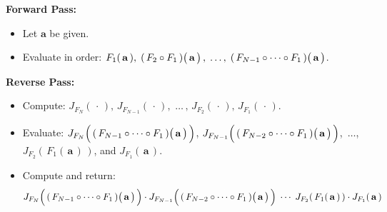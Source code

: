 \vskip 0.5cm
\noindent
\textbf{Forward Pass:}
\begin{itemize}
\item
	Let \;$\mathbf{a}$\; be given.
\item
	Evaluate in order: \;
	$F_{1}(\,\mathbf{a}\,),\;
	(\,F_{2}\circ F_{1}\,)\!\left(\,\overset{{\color{white}.}}{\mathbf{a}}\,\right),\;
	\ldots,\;
	(\,F_{N-1}\circ \cdots \circ F_{1}\,)\!\left(\,\overset{{\color{white}.}}{\mathbf{a}}\,\right)
	$.
\end{itemize}
\vskip 0.3cm
\noindent
\textbf{Reverse Pass:}
\begin{itemize}
\item
	Compute:\;
	$J_{F_{N}}\!\left(\,\cdot\,\right),\,
	J_{F_{N-1}}\!\left(\,\cdot\,\right),\,
	\,\ldots\,,\,
	J_{F_{2}}\!\left(\,\cdot\,\right),\,
	J_{F_{1}}\!\left(\,\cdot\,\right)$.
\item
	Evaluate:\;
	$J_{F_{N}}\!\left(\,
		\overset{{\color{white}.}}{(\,F_{N-1}\circ \cdots \circ F_{1}\,)
		\!\left(\,\overset{{\color{white}.}}{\mathbf{a}}\,\right)}
		\,\right)$,
	$J_{F_{N-1}}\!\left(\,
		\overset{{\color{white}.}}{(\,F_{N-2}\circ \cdots \circ F_{1}\,)
		\!\left(\,\overset{{\color{white}.}}{\mathbf{a}}\,\right)}
		\,\right)$,
	\,$\ldots$\;,
	$J_{F_{2}}\!\left(\,F_{1}(\,\mathbf{a}\,)\,\right)$,
	and
	$J_{F_{1}}\!\left(\,\mathbf{a}\,\right)$.
\item
	Compute and return:
	\begin{equation*}
	J_{F_{N}}\!\left(\,
		\overset{{\color{white}.}}{(\,F_{N-1}\circ \cdots \circ F_{1}\,)
		\!\left(\,\overset{{\color{white}.}}{\mathbf{a}}\,\right)}
		\,\right)
	\cdot
	J_{F_{N-1}}\!\left(\,
		\overset{{\color{white}.}}{(\,F_{N-2}\circ \cdots \circ F_{1}\,)
		\!\left(\,\overset{{\color{white}.}}{\mathbf{a}}\,\right)}
		\,\right)
	\;
	\cdots
	\;
	J_{F_{2}}\!\left(\,F_{1}(\,\mathbf{a}\,)\,\right)
	\cdot
	J_{F_{1}}\!\left(\,\mathbf{a}\,\right)
	\end{equation*}
\end{itemize}



\renewcommand{\theenumi}{\roman{enumi}}
\renewcommand{\labelenumi}{\textnormal{(\theenumi)}$\;\;$}

